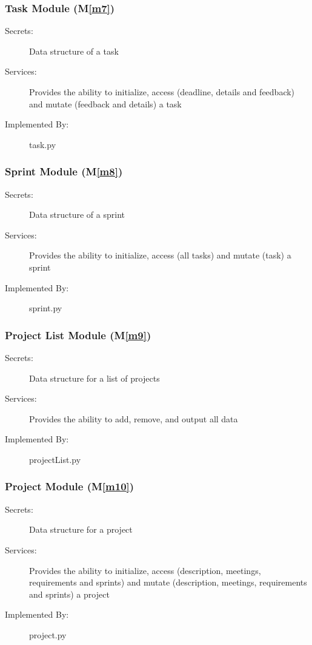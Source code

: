 \documentclass[12pt, titlepage]{article}
\newcommand{\mref}[1]{M\ref{#1}}
\begin{document}
\subsubsection{Task Module (\mref{m7})}
\begin{description}
    \item[Secrets:] Data structure of a task
    \item[Services:] Provides the ability to initialize, access (deadline, details and feedback) and mutate (feedback and details) a task
    \item[Implemented By:] task.py
\end{description}

\subsubsection{Sprint Module (\mref{m8})}
\begin{description}
    \item[Secrets:] Data structure of a sprint
    \item[Services:] Provides the ability to initialize, access (all tasks) and mutate (task) a sprint
    \item[Implemented By:] sprint.py
\end{description}

\subsubsection{Project List Module (\mref{m9})}
\begin{description}
    \item[Secrets:] Data structure for a list of projects
    \item[Services:] Provides the ability to add, remove, and output all data
    \item[Implemented By:] projectList.py
\end{description}

\subsubsection{Project Module (\mref{m10})}
\begin{description}
    \item[Secrets:] Data structure for a project
    \item[Services:] Provides the ability to initialize, access (description, meetings, requirements and sprints) and mutate (description, meetings, requirements and sprints) a project
    \item[Implemented By:] project.py
\end{description}
\end{document}
